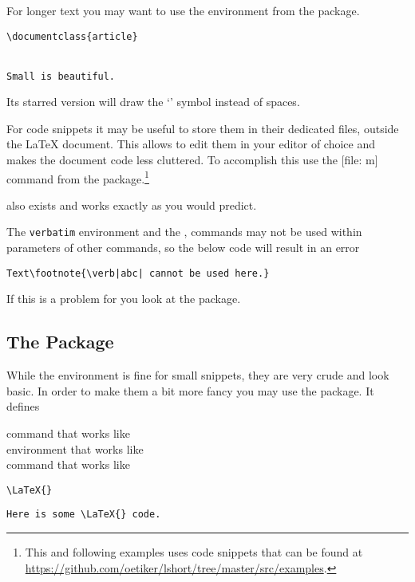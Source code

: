 For longer text you may want to use the  environment from the
 package.
\begin{example}
\begin{verbatim}
\documentclass{article}


Small is beautiful.

\end{verbatim}
\end{example}
Its starred version will draw the \enquote*{\textvisiblespace}
symbol instead of spaces.

For code snippets it may be useful to store them in their dedicated files,
outside the \LaTeX{} document. This allows to edit them in your editor of
choice and makes the document code less cluttered. To accomplish this use the
[file: m] command from the  package.\footnote{This
  and following examples uses code snippets that can be found at \url{https://github.com/oetiker/lshort/tree/master/src/examples}.}
\begin{example}[examplewidth=0.55\linewidth, vertical_mode]

\end{example}
 also exists and works exactly as you would predict.

The \texttt{verbatim} environment and the , 
commands may not be used within parameters of other commands, so the below code
will result in an error
\begin{verbatim}
Text\footnote{\verb|abc| cannot be used here.}
\end{verbatim}
If this is a problem for you look at the  package.

\subsection{The  Package}

While the  environment is fine for small snippets, they are very
crude and look basic. In order to make them a bit more fancy you may use the
 package. It defines
\begin{lscommand}
   command that works like  \\
   environment that works like  \\
   command that works like 
\end{lscommand}
\begin{example}[examplewidth=0.6\linewidth, vertical_mode]
\lstinline|\LaTeX{}|

\begin{lstlisting}
Here is some \LaTeX{} code.
\end{lstlisting}


\end{example}

